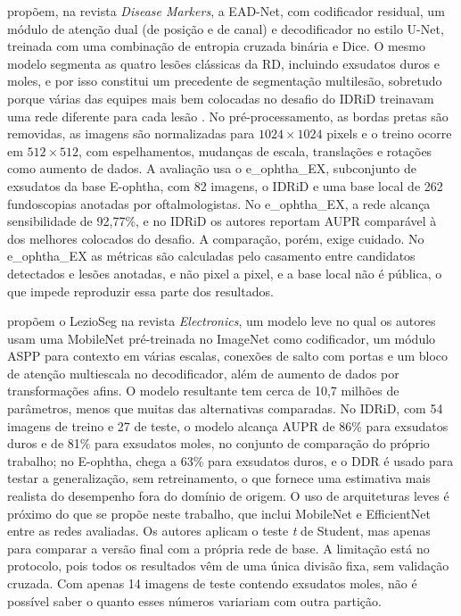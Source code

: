  propõem, na revista \textit{Disease Markers}, a EAD-Net, com codificador residual, um módulo de atenção dual (de posição e de canal) e decodificador no estilo U-Net, treinada com uma combinação de entropia cruzada binária e Dice. O mesmo modelo segmenta as quatro lesões clássicas da RD, incluindo exsudatos duros e moles, e por isso constitui um precedente de segmentação multilesão, sobretudo porque várias das equipes mais bem colocadas no desafio do IDRiD treinavam uma rede diferente para cada lesão \cite{porwal2020idrid}. No pré-processamento, as bordas pretas são removidas, as imagens são normalizadas para $1024 \times 1024$ pixels e o treino ocorre em $512 \times 512$, com espelhamentos, mudanças de escala, translações e rotações como aumento de dados. A avaliação usa o e\_ophtha\_EX, subconjunto de exsudatos da base E-ophtha, com 82 imagens, o IDRiD e uma base local de 262 fundoscopias anotadas por oftalmologistas. No e\_ophtha\_EX, a rede alcança sensibilidade de 92,77\%, e no IDRiD os autores reportam AUPR comparável à dos melhores colocados do desafio. A comparação, porém, exige cuidado. No e\_ophtha\_EX as métricas são calculadas pelo casamento entre candidatos detectados e lesões anotadas, e não pixel a pixel, e a base local não é pública, o que impede reproduzir essa parte dos resultados.

 propõem o LezioSeg na revista \textit{Electronics}, um modelo leve no qual os autores usam uma MobileNet pré-treinada no ImageNet como codificador, um módulo ASPP para contexto em várias escalas, conexões de salto com portas e um bloco de atenção multiescala no decodificador, além de aumento de dados por transformações afins. O modelo resultante tem cerca de 10,7 milhões de parâmetros, menos que muitas das alternativas comparadas. No IDRiD, com 54 imagens de treino e 27 de teste, o modelo alcança AUPR de 86\% para exsudatos duros e de 81\% para exsudatos moles, no conjunto de comparação do próprio trabalho; no E-ophtha, chega a 63\% para exsudatos duros, e o DDR é usado para testar a generalização, sem retreinamento, o que fornece uma estimativa mais realista do desempenho fora do domínio de origem. O uso de arquiteturas leves é próximo do que se propõe neste trabalho, que inclui MobileNet e EfficientNet entre as redes avaliadas. Os autores aplicam o teste \textit{t} de Student, mas apenas para comparar a versão final com a própria rede de base. A limitação está no protocolo, pois todos os resultados vêm de uma única divisão fixa, sem validação cruzada. Com apenas 14 imagens de teste contendo exsudatos moles, não é possível saber o quanto esses números variariam com outra partição.

